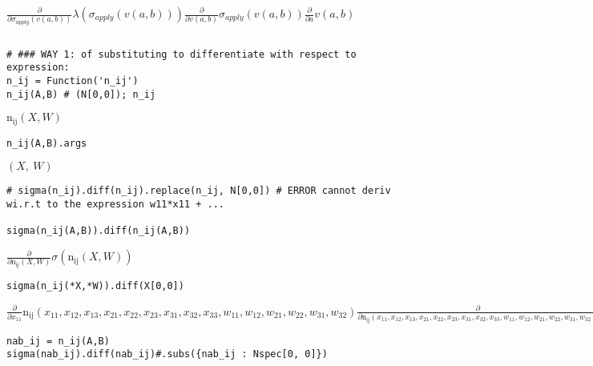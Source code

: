 \documentclass[
]{article}
\begin{document}
\(\displaystyle \frac{\partial}{\partial \sigma_{apply}{\left(v{\left(a,b \right)} \right)}} \lambda{\left(\sigma_{apply}{\left(v{\left(a,b \right)} \right)} \right)} \frac{\partial}{\partial v{\left(a,b \right)}} \sigma_{apply}{\left(v{\left(a,b \right)} \right)} \frac{\partial}{\partial a} v{\left(a,b \right)}\)

\begin{verbatim}

\end{verbatim}

\begin{verbatim}
# ### WAY 1: of substituting to differentiate with respect to expression:
n_ij = Function('n_ij')
n_ij(A,B) # (N[0,0]); n_ij
\end{verbatim}

\(\displaystyle \operatorname{n_{ij}}{\left(X,W \right)}\)

\begin{verbatim}
n_ij(A,B).args
\end{verbatim}

\(\displaystyle \left( X, \  W\right)\)

\begin{verbatim}
# sigma(n_ij).diff(n_ij).replace(n_ij, N[0,0]) # ERROR cannot deriv wi.r.t to the expression w11*x11 + ...

sigma(n_ij(A,B)).diff(n_ij(A,B))
\end{verbatim}

\(\displaystyle \frac{\partial}{\partial \operatorname{n_{ij}}{\left(X,W \right)}} \sigma{\left(\operatorname{n_{ij}}{\left(X,W \right)} \right)}\)

\begin{verbatim}
sigma(n_ij(*X,*W)).diff(X[0,0])
\end{verbatim}

\(\displaystyle \frac{\partial}{\partial x_{11}} \operatorname{n_{ij}}{\left(x_{11},x_{12},x_{13},x_{21},x_{22},x_{23},x_{31},x_{32},x_{33},w_{11},w_{12},w_{21},w_{22},w_{31},w_{32} \right)} \frac{\partial}{\partial \operatorname{n_{ij}}{\left(x_{11},x_{12},x_{13},x_{21},x_{22},x_{23},x_{31},x_{32},x_{33},w_{11},w_{12},w_{21},w_{22},w_{31},w_{32} \right)}} \sigma{\left(\operatorname{n_{ij}}{\left(x_{11},x_{12},x_{13},x_{21},x_{22},x_{23},x_{31},x_{32},x_{33},w_{11},w_{12},w_{21},w_{22},w_{31},w_{32} \right)} \right)}\)

\begin{verbatim}
nab_ij = n_ij(A,B)
sigma(nab_ij).diff(nab_ij)#.subs({nab_ij : Nspec[0, 0]})
\end{verbatim}
\end{document}
